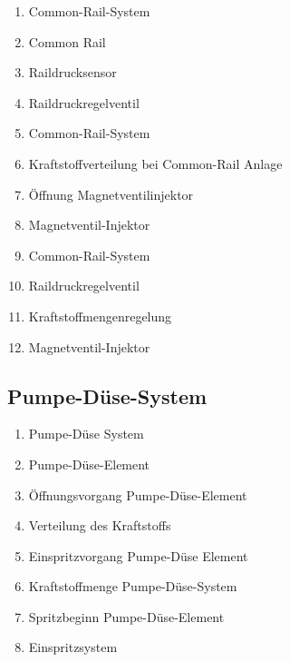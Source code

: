\begin{enumerate}
\item
  Common-Rail-System\\
\item
  Common Rail\\
\item
  Raildrucksensor\\
\item
  Raildruckregelventil\\
\item
  Common-Rail-System\\
\item
  Kraftstoffverteilung bei Common-Rail Anlage\\
\item
  Öffnung Magnetventilinjektor\\
\item
  Magnetventil-Injektor\\
\item
  Common-Rail-System\\
\item
  Raildruckregelventil\\
\item
  Kraftstoffmengenregelung\\
\item
  Magnetventil-Injektor
\end{enumerate}

\subsection{Pumpe-Düse-System}\label{pumpe-duese-system}

\begin{enumerate}
\item
  Pumpe-Düse System\\
\item
  Pumpe-Düse-Element\\
\item
  Öffnungsvorgang Pumpe-Düse-Element\\
\item
  Verteilung des Kraftstoffs\\
\item
  Einspritzvorgang Pumpe-Düse Element\\
\item
  Kraftstoffmenge Pumpe-Düse-System\\
\item
  Spritzbeginn Pumpe-Düse-Element\\
\item
  Einspritzsystem
\end{enumerate}

